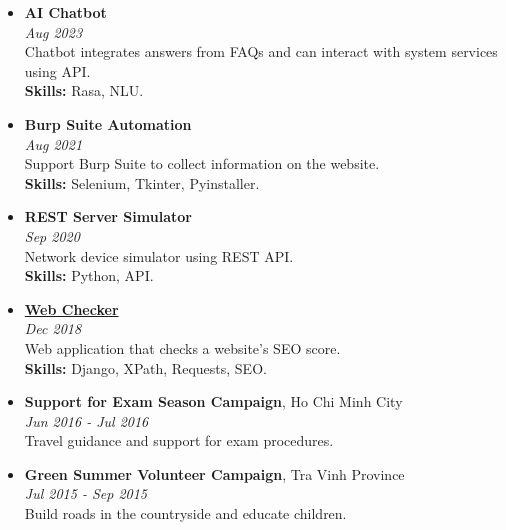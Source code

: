 \documentclass[12pt,a4paper]{article}
\begin{document}
	\begin{itemize}
		\item {
			\textbf{AI Chatbot} \\
			\small{\textit{\color{gray}Aug 2023}} \\
			\small{Chatbot integrates answers from FAQs and can interact with system services using API.} \\
			\textbf{Skills:} Rasa, NLU.
		}
		
		\item {
			\textbf{Burp Suite Automation} \\
			\small{\textit{\color{gray}Aug 2021}} \\
			\small{Support Burp Suite to collect information on the website.} \\
			\textbf{Skills:} Selenium, Tkinter, Pyinstaller.
		}
		
		\item {
			\textbf{REST Server Simulator} \\
			\small{\textit{\color{gray}Sep 2020}} \\
			\small{Network device simulator using REST API.} \\
			\textbf{Skills:} Python, API.
		}
		
		\item {
			\textbf{\href{https://github.com/thinh9e/web-checker}{Web Checker}} \\
			\small{\textit{\color{gray}Dec 2018}} \\
			\small{Web application that checks a website's SEO score.} \\
			\textbf{Skills:} Django, XPath, Requests, SEO.
		}
%		
	\end{itemize}
	
	\begin{itemize}
		\item {
			\textbf{Support for Exam Season Campaign}, Ho Chi Minh City \\
			\small{\textit{\color{gray}Jun 2016 - Jul 2016}} \\
			\small{Travel guidance and support for exam procedures.}
		}
		
		\item {
			\textbf{Green Summer Volunteer Campaign}, Tra Vinh Province \\
			\small{\textit{\color{gray}Jul 2015 - Sep 2015}} \\
			\small{Build roads in the countryside and educate children.}
		}
	\end{itemize}
\end{document}
